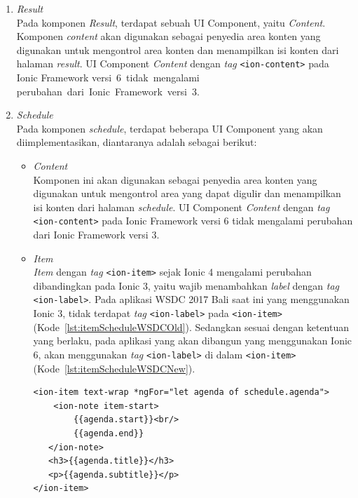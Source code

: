 \begin{enumerate}
	\item \textit{Result} \\ 
	Pada komponen \textit{Result}, terdapat sebuah UI Component, yaitu \textit{Content}. Komponen \textit{content} akan digunakan sebagai penyedia area konten yang digunakan untuk mengontrol area konten dan menampilkan isi konten dari halaman \textit{result}. UI Component \textit{Content} dengan \textit{tag} \texttt{<ion-content>} pada Ionic Framework versi~6~tidak~mengalami perubahan~dari~Ionic~Framework~versi~3. 
		
	\item \textit{Schedule} \\
	Pada komponen \textit{schedule}, terdapat beberapa UI Component yang akan diimplementasikan, diantaranya adalah sebagai berikut:
		\begin{itemize}
			\item \textit{Content} \\
		Komponen ini akan digunakan sebagai penyedia area konten yang digunakan untuk mengontrol area yang dapat digulir dan menampilkan isi konten dari halaman \textit{schedule}. UI Component \textit{Content} dengan \textit{tag} \texttt{<ion-content>} pada Ionic Framework versi 6 tidak mengalami perubahan dari Ionic Framework versi 3.
		
			\item \textit{Item} \\
			\textit{Item} dengan \textit{tag} \texttt{<ion-item>} sejak Ionic 4 mengalami perubahan dibandingkan pada Ionic 3, yaitu wajib menambahkan \textit{label} dengan \textit{tag} \texttt{<ion-label>}. Pada aplikasi WSDC 2017 Bali saat ini yang menggunakan Ionic 3, tidak terdapat \textit{tag} \texttt{<ion-label>} pada \texttt{<ion-item>} (Kode~\ref{lst:itemScheduleWSDCOld}). Sedangkan sesuai dengan ketentuan yang berlaku, pada aplikasi yang akan dibangun yang menggunakan Ionic 6, akan menggunakan \textit{tag} \texttt{<ion-label>} di dalam \texttt{<ion-item>} (Kode~\ref{lst:itemScheduleWSDCNew}).
		
		\newpage
			
\begin{lstlisting}[label={lst:itemScheduleWSDCOld}, caption=\textit{Tag} <ion-item> dengan Ionic 3 di Aplikasi WSDC 2017 Bali Saat Ini]
<ion-item text-wrap *ngFor="let agenda of schedule.agenda">
	<ion-note item-start>
		{{agenda.start}}<br/>
        {{agenda.end}}
   </ion-note>
   <h3>{{agenda.title}}</h3>
   <p>{{agenda.subtitle}}</p>
</ion-item>
\end{lstlisting}


\end{itemize}
\end{enumerate}
